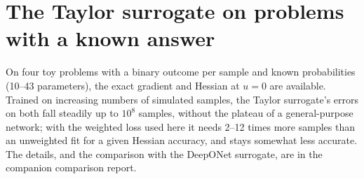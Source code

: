 \documentclass[11pt,a4paper]{article}
\begin{document}
\section{The Taylor surrogate on problems with a known answer}
\label{app:toys}

On four toy problems with a binary outcome per sample and known probabilities (10--43 parameters),
the exact gradient and Hessian at $u=0$ are available. Trained on increasing numbers of simulated
samples, the Taylor surrogate's errors on both fall steadily up to $10^8$ samples, without the
plateau of a general-purpose network; with the weighted loss used here it needs 2--12 times more
samples than an unweighted fit for a given Hessian accuracy, and stays somewhat less accurate. The details, and
the comparison with the DeepONet surrogate, are in the companion comparison report.
\end{document}
